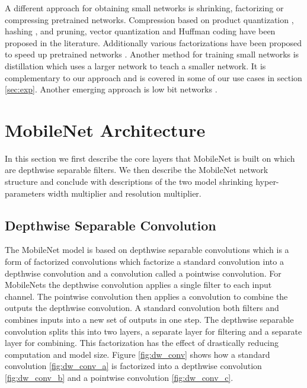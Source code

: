 \documentclass[10pt,twocolumn,letterpaper]{article}
\begin{document}
A different approach for obtaining small networks is shrinking, factorizing or compressing pretrained networks. Compression based on product quantization \cite{wu2015quantized}, hashing \cite{chen2015compressing}, and pruning, vector quantization and Huffman coding \cite{han2015deep} have been proposed in the literature. Additionally various factorizations have been proposed to speed up pretrained networks \cite{jaderberg2014speeding, lebedev2014speeding}. Another method for training small networks is distillation \cite{hinton2015distilling} which uses a larger network to teach a smaller network. It is complementary to our approach and is covered in some of our use cases in section \ref{sec:exp}. Another emerging approach is low bit networks \cite{courbariaux2014training, rastegari2016xnor, hubara2016quantized}.

\section{MobileNet Architecture} \label{sec:mobilenet}

In this section we first describe the core layers that MobileNet is built on which are depthwise separable filters. We then describe the MobileNet network structure and conclude with descriptions of the two model shrinking hyper-parameters width multiplier and resolution multiplier.

\subsection{Depthwise Separable Convolution}

The MobileNet model is based on depthwise separable convolutions which is a form of factorized convolutions which factorize a standard convolution into a depthwise convolution and a  convolution called a pointwise convolution. For MobileNets the depthwise convolution applies a single filter to each input channel. The pointwise convolution then applies a  convolution to combine the outputs the depthwise convolution. A standard convolution both filters and combines inputs into a new set of outputs in one step. The depthwise separable convolution splits this into two layers, a separate layer for filtering and a separate layer for combining. This factorization has the effect of drastically reducing computation and model size. Figure \ref{fig:dw_conv} shows how a standard convolution \ref{fig:dw_conv_a} is factorized into a depthwise convolution \ref{fig:dw_conv_b} and a  pointwise convolution \ref{fig:dw_conv_c}.
\end{document}

